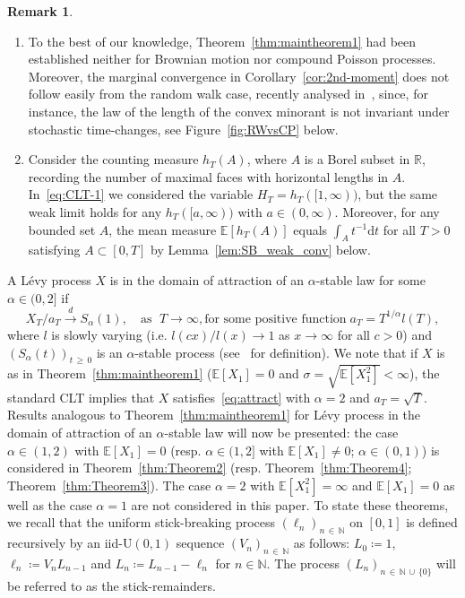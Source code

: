 \documentclass[10pt]{amsart}
\theoremstyle{definition}\newtheorem{defi}[theo]{Definition}\newtheorem{rema}[theo]{Remark}\newtheorem{exam}[theo]{Example}\newtheorem{exem}[theo]{Example}\newtheorem{nota}[theo]{Notation}
\newcommand\N{\mathbb{N}}
\newcommand\R{\mathbb{R}}
\newcommand\E{\mathds{E}}
\newcommand\1{\mathds{1}}
\newcommand\D{\mathrm{d}}
\newcommand\U{\mathrm{U}}
\newcommand\cid{\xrightarrow{d}}
\begin{document}
\begin{rema}
\begin{enumerate}
\item\label{rema1.3.v} To the best of our knowledge, Theorem~\ref{thm:maintheorem1} had been established neither for Brownian motion nor compound Poisson processes. Moreover, the marginal convergence in Corollary~\ref{cor:2nd-moment} does not follow easily from the random walk case, recently analysed in~\cite{RWpaper}, since, for instance, the law of the length of the convex minorant is not invariant under stochastic time-changes, see Figure~\ref{fig:RWvsCP} below. 
\item\label{rema1.3.vi} Consider the counting measure $h_T(A)$, where $A$ is a Borel subset in $\R$, recording the number of maximal faces with horizontal lengths in $A$. In~\eqref{eq:CLT-1} we considered the variable $H_T=h_T([1,\infty))$, but the same weak limit holds for any $h_T([a,\infty))$ with $a\in(0,\infty)$. Moreover, for any bounded set $A$, the mean measure $\E[h_T(A)]$ equals $\int_{A} t^{-1}\D t$ for all $T>0$ satisfying $A\subset [0,T]$ by Lemma~\ref{lem:SB_weak_conv} below.
\end{enumerate}
\end{rema}


A Lévy process $X$ is in the domain of attraction of an $\alpha$-stable law for some $\alpha\in(0,2]$ if
\begin{equation}\label{eq:attract}
X_{T}/a_T\cid S_\alpha(1),
\quad\text{as }\;T\to\infty, \text{for some positive function}\; a_T=T^{1/\alpha}l(T),
\end{equation}
where $l$ is slowly varying (i.e. $l(cx)/l(x)\to 1$ as $x\to\infty$ for all $c>0$) and $(S_\alpha(t))_{t\,\ge\,0}$ is an $\alpha$-stable process (see~\cite[Chapter~3]{SatoBookLevy} for definition). We note that if $X$ is as in Theorem~\ref{thm:maintheorem1} ($\E[X_1]=0$ and $\sigma=\sqrt{\E[X_1^2]}<\infty$), the standard CLT implies that $X$ satisfies~\eqref{eq:attract} with $\alpha=2$ and $a_T=\sqrt{T}$. Results analogous to Theorem~\ref{thm:maintheorem1} for Lévy process in the domain of attraction of an $\alpha$-stable law will now be presented: the case $\alpha\in(1,2)$ with $\E[X_1]=0$ (resp. $\alpha\in(1,2]$ with $\E[X_1]\ne 0$; $\alpha\in(0,1)$) is considered in Theorem~\ref{thm:Theorem2} (resp. Theorem~\ref{thm:Theorem4}; Theorem~\ref{thm:Theorem3}). The case $\alpha=2$ with $\E[X_1^2]=\infty$ and $\E [X_1]=0$ as well as the case $\alpha=1$ are not considered in this paper. To state these theorems, we recall that the uniform stick-breaking process $(\ell_n)_{n\,\in\,\N}$ on $[0,1]$ is defined recursively by an iid-$\U(0,1)$ sequence $(V_n)_{n\,\in\,\N}$ as follows: $L_0\coloneqq 1$, $\ell_n\coloneqq V_nL_{n-1}$ and $L_n\coloneqq L_{n-1}-\ell_n$ for $n\in\N$. The process $(L_n)_{n\,\in\,\N\,\cup\,\{0\}}$ will be referred to as the stick-remainders.
\end{document}
